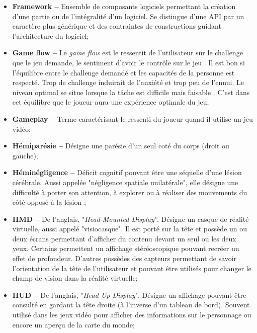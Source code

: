\begin{itemize}
	\item \textbf{Framework --} Ensemble de composants logiciels permettant la création d'une partie ou de l'intégralité d'un logiciel. Se distingue d'une API par un caractère plus générique et des contraintes de constructions guidant l'architecture du logiciel;
	
	\item \textbf{Game flow --} Le \textit{game flow} est le ressentit de l'utilisateur sur le challenge que le jeu demande, le sentiment d'avoir le contrôle sur le jeu \cite{Salen_RulesOfPlay}. Il est bon si l'équilibre entre le challenge demandé et les capacités de la personne est respecté. Trop de challenge induirait de l'anxiété et trop peu de l'ennui. Le niveau optimal se situe lorsque la tâche est difficile mais faisable \cite{Green_ExercisingBrain}. C'est dans cet équilibre que le joueur aura une expérience optimale du jeu;
	
	\item \textbf{Gameplay --} Terme caractérisant le ressenti du joueur quand il utilise un jeu vidéo;
	
	\item \textbf{Hémiparésie --} Désigne une parésie d'un seul coté du corps (droit ou gauche);
	
	\item \textbf{Héminégligence --} Déficit cognitif pouvant être une séquelle d'une lésion cérébrale. Aussi appelée "négligence spatiale unilatérale", elle désigne une difficulté à porter son attention, à explorer ou à réaliser des mouvements du côté opposé à la lésion \cite{InformationHeminegligence}; 
	
	\item \textbf{HMD --} De l'anglais, "\textit{Head-Mounted Display}". Désigne un casque de réalité virtuelle, aussi appelé "visiocasque". Il est porté sur la tête et possède un ou deux écrans permettant d'afficher du contenu devant un seul ou les deux yeux. Certains permettent un affichage stéréoscopique pouvant recréer un effet de profondeur. D'autres possèdes des capteurs permettant de savoir l'orientation de la tête de l'utilisateur et pouvant être utilisés pour changer le champ de vision dans la réalité virtuelle;
	
	\item \textbf{HUD --} De l'anglais, "\textit{Head-Up Display}". Désigne un affichage pouvant être consulté en gardant la tête droite (à l'inverse d'un tableau de bord). Souvent utilisé dans les jeux vidéo pour afficher des informations sur le personnage ou encore un aperçu de la carte du monde;
	

\end{itemize}
